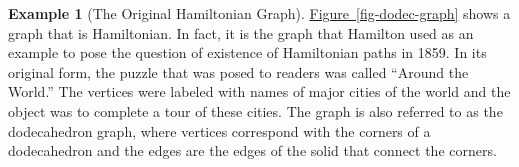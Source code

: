 \documentclass[10pt,]{book}
\theoremstyle{plain}
\theoremstyle{definition}
\theoremstyle{definition}
\theoremstyle{definition}
\newtheorem{example}[theorem]{Example}
\theoremstyle{definition}
\theoremstyle{definition}
\numberwithin{equation}{section}
\newlength{\panelmax}
\begin{document}
\begin{example}[The Original Hamiltonian Graph]\label{ex-dodec-graph}
\hyperref[fig-dodec-graph]{Figure~\ref{fig-dodec-graph}} shows a graph that is Hamiltonian. In fact, it is the graph that Hamilton used as an example to pose the question of existence of Hamiltonian paths in 1859. In its original form, the puzzle that was posed to readers was called ``Around the World.'' The vertices were labeled with names of major cities of the world and the object was to complete a tour of these cities. The graph is also referred to as the
dodecahedron graph, where vertices correspond with the corners of a dodecahedron and the edges are the edges of the solid that connect the corners.%
{%
\setlength{\panelmax}{0pt}
\newsavebox{\panelboxVimage}
\newlength{\phVimage}\setlength{\phVimage}{\ht\panelboxVimage+\dp\panelboxVimage}
\settototalheight{\phVimage}{\usebox{\panelboxVimage}}
\setlength{\panelmax}{\maxof{\panelmax}{\phVimage}}
\newsavebox{\panelboxWimage}
\newlength{\phWimage}\setlength{\phWimage}{\ht\panelboxWimage+\dp\panelboxWimage}
\settototalheight{\phWimage}{\usebox{\panelboxWimage}}
}
\end{example}
\end{document}
